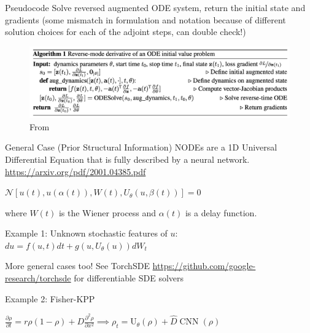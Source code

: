 \documentclass[usenames,dvipsnames]{beamer}
\theoremstyle{definition}
\let\oldcite=\cite
\renewcommand{\cite}[2][]{\textcolor{green}{\oldcite[#1]{#2}}}
\begin{document}
\begin{frame}{Pseudocode}
    Solve reversed augmented ODE system, return the initial state and gradients (some mismatch in formulation and notation because of different solution choices for each of the adjoint steps, can double check!)
    \begin{figure}
        \centering
        \includegraphics[width=\linewidth]{alg_revmode.jpg}
        \caption{From \cite{chen2019neural}}
        \label{fig:adj_alg}
    \end{figure}

\end{frame}


\begin{frame}{General Case (Prior Structural Information)}
    NODEs are a 1D Universal Differential Equation that is fully described by a neural network. \url{https://arxiv.org/pdf/2001.04385.pdf}

    $\mathcal{N}[u(t),u(\alpha(t)),W(t),U_\theta(u,\beta(t))]=0$

    where $W(t)$ is the Wiener process and $\alpha(t)$ is a delay function.

    Example 1: 
    Unknown stochastic features of $u$: $du=f(u,t)dt+g(u,U_\theta(u))dW_t$

    More general cases too! See TorchSDE \url{https://github.com/google-research/torchsde} for differentiable SDE solvers

    Example 2: Fisher-KPP 

    $\frac{\partial\rho}{\partial t}=r\rho(1-\rho)+D\frac{\partial^2\rho}{\partial x^2} \implies \rho_t=\mathrm{U}_\theta(\rho)+\hat{D}\operatorname{CNN}(\rho)$
    
\end{frame}
\end{document}
